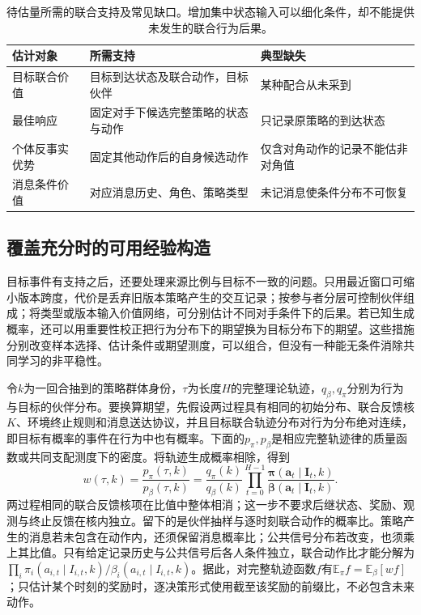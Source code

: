 \begin{table}[htbp]
 \centering
 \begin{tabularx}{\linewidth}{@{}l >{\raggedright\arraybackslash}X >{\raggedright\arraybackslash}X@{}}
 \toprule
 估计对象 & 所需支持 & 典型缺失\\
 \midrule
 目标联合价值 & 目标到达状态及联合动作，目标伙伴 & 某种配合从未采到\\
 最佳响应 & 固定对手下候选完整策略的状态与动作 & 只记录原策略的到达状态\\
 个体反事实优势 & 固定其他动作后的自身候选动作 & 仅含对角动作的记录不能估非对角值\\
 消息条件价值 & 对应消息历史、角色、策略类型 & 未记消息使条件分布不可恢复\\
 \bottomrule
 \end{tabularx}
 \caption{待估量所需的联合支持及常见缺口。增加集中状态输入可以细化条件，却不能提供未发生的联合行为后果。}
 \label{tab:rl-multi-agent-support}
\end{table}

\subsection{覆盖充分时的可用经验构造}
\label{sec:rl-multi-agent-reweight}

目标事件有支持之后，还要处理来源比例与目标不一致的问题。只用最近窗口可缩小版本跨度，代价是丢弃旧版本策略产生的交互记录；按参与者分层可控制伙伴组成；将类型或版本输入价值网络，可分别估计不同对手条件下的后果。若已知生成概率，还可以用重要性校正把行为分布下的期望换为目标分布下的期望。这些措施分别改变样本选择、估计条件或期望测度，可以组合，但没有一种能无条件消除共同学习的非平稳性。

令$k$为一回合抽到的策略群体身份，$\tau$为长度$H$的完整理论轨迹，$q_\beta,q_\pi$分别为行为与目标的伙伴分布。要换算期望，先假设两过程具有相同的初始分布、联合反馈核$K$、环境终止规则和消息送达协议，并且目标联合轨迹分布对行为分布绝对连续，即目标有概率的事件在行为中也有概率。下面的$p_\pi,p_\beta$是相应完整轨迹律的质量函数或共同支配测度下的密度。将轨迹生成概率相除，得到
\begin{equation}
 w(\tau,k)=\frac{p_\pi(\tau,k)}{p_\beta(\tau,k)}
 =\frac{q_\pi(k)}{q_\beta(k)}
   \prod_{t=0}^{H-1}
   \frac{\bm\pi(\bm a_t\mid\bm I_t,k)}
        {\bm\beta(\bm a_t\mid\bm I_t,k)}.
 \label{eq:rl-multi-agent-is}
\end{equation}
两过程相同的联合反馈核项在比值中整体相消；这一步不要求后继状态、奖励、观测与终止反馈在核内独立。留下的是伙伴抽样与逐时刻联合动作的概率比。策略产生的消息若未包含在动作内，还须保留消息概率比；公共信号分布若改变，也须乘上其比值。只有给定记录历史与公共信号后各人条件独立，联合动作比才能分解为$\prod_i\pi_i(a_{i,t}\mid I_{i,t},k)/\beta_i(a_{i,t}\mid I_{i,t},k)$。据此，对完整轨迹函数$f$有$\mathbb E_\pi f=\mathbb E_\beta[wf]$；只估计某个时刻的奖励时，逐决策形式使用截至该奖励的前缀比，不必包含未来动作。

